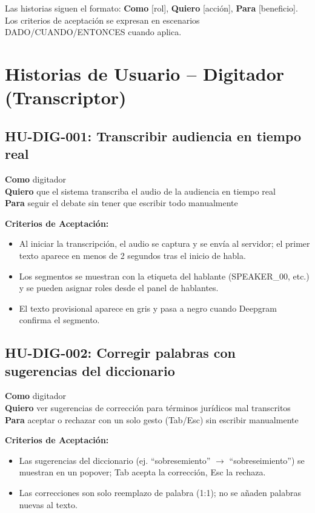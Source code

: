 \documentclass[12pt,a4paper]{report}
\begin{document}
Las historias siguen el formato: \textbf{Como} [rol], \textbf{Quiero} [acción], \textbf{Para} [beneficio]. Los criterios de aceptación se expresan en escenarios DADO/CUANDO/ENTONCES cuando aplica.

\section{Historias de Usuario -- Digitador (Transcriptor)}

\subsection{HU-DIG-001: Transcribir audiencia en tiempo real}

\textbf{Como} digitador \\
\textbf{Quiero} que el sistema transcriba el audio de la audiencia en tiempo real \\
\textbf{Para} seguir el debate sin tener que escribir todo manualmente

\textbf{Criterios de Aceptación:}
\begin{itemize}
    \item Al iniciar la transcripción, el audio se captura y se envía al servidor; el primer texto aparece en menos de 2 segundos tras el inicio de habla.
    \item Los segmentos se muestran con la etiqueta del hablante (SPEAKER\_00, etc.) y se pueden asignar roles desde el panel de hablantes.
    \item El texto provisional aparece en gris y pasa a negro cuando Deepgram confirma el segmento.
\end{itemize}

\subsection{HU-DIG-002: Corregir palabras con sugerencias del diccionario}

\textbf{Como} digitador \\
\textbf{Quiero} ver sugerencias de corrección para términos jurídicos mal transcritos \\
\textbf{Para} aceptar o rechazar con un solo gesto (Tab/Esc) sin escribir manualmente

\textbf{Criterios de Aceptación:}
\begin{itemize}
    \item Las sugerencias del diccionario (ej. ``sobresemiento'' $\to$ ``sobreseimiento'') se muestran en un popover; Tab acepta la corrección, Esc la rechaza.
    \item Las correcciones son solo reemplazo de palabra (1:1); no se añaden palabras nuevas al texto.
\end{itemize}
\end{document}
